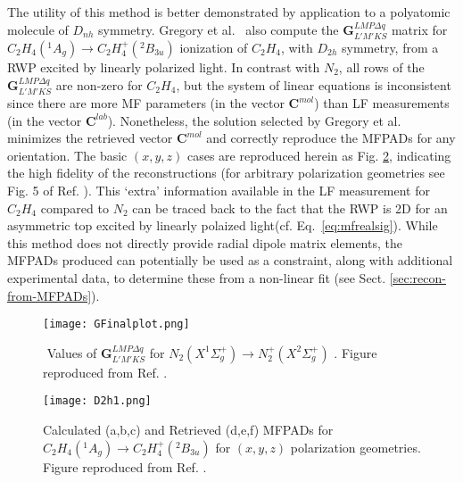 \documentclass[10pt]{article}
\begin{document}
The utility of this method is better demonstrated by application to a polyatomic molecule of $D_{nh}$ symmetry. Gregory et al.~\cite{gregory2021MolecularFramePhotoelectron} also compute the $\mathbf{{G}}^{LMP\Delta q }_{L'M'KS}$ matrix for $C_2H_4(^1A_g) \rightarrow C_2H_4^+(^2B_{3u})$ ionization of $C_2H_4$, with $D_{2h}$ symmetry, from a RWP excited by linearly polarized light. In contrast with $N_2$, all rows of the $\mathbf{{G}}^{LMP\Delta q }_{L'M'KS}$ are non-zero for $C_2H_4$, but the system of linear equations is inconsistent since there are more MF parameters (in the vector $\mathbf{C}^{mol}$) than LF measurements (in the vector $\mathbf{C}^{lab}$). Nonetheless, the solution selected by Gregory et al. minimizes the retrieved vector $\mathbf{C}^{mol}$ and correctly reproduce the MFPADs for any orientation. The basic $(x,y,z)$ cases are reproduced herein as Fig. \ref{584598}, indicating the high fidelity of the reconstructions (for arbitrary polarization geometries see Fig. 5 of Ref. \cite{gregory2021MolecularFramePhotoelectron}). This `extra' information available in the LF measurement for $C_2H_4$ compared to $N_2$ can be traced back to the fact that the RWP is 2D for an asymmetric top excited by linearly polaized light(cf. Eq.~\ref{eq:mfrealsig}). While this method does not directly provide radial dipole matrix elements, the MFPADs produced can potentially be used as a constraint, along with additional experimental data, to determine these from a non-linear fit (see Sect. \ref{sec:recon-from-MFPADs}). 

\begin{figure}[]
\begin{center}
\texttt{[image: GFinalplot.png]}
\caption{\(\) Values of \(\mathbf{G}^{LMP\Delta q }_{L'M'KS}\) for \(N_2(X^{1}\Sigma^{+}_{g}) \rightarrow N^+_2(X^{2}\Sigma^{+}_{g})\) . Figure reproduced from Ref. \cite{gregory2021MolecularFramePhotoelectron}.\label{931809}}
\end{center}
\end{figure}


\begin{figure}[]
\begin{center}
\texttt{[image: D2h1.png]}
\caption{Calculated (a,b,c) and Retrieved (d,e,f) MFPADs for \(C_2 H_4(^1A_g) \rightarrow C_2H_4^+(^2B_{3u})\) for \((x,y,z)\) polarization geometries. Figure reproduced from Ref. \cite{gregory2021MolecularFramePhotoelectron}.\label{584598}}
\end{center}
\end{figure}
\end{document}
